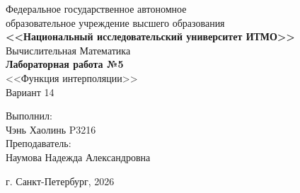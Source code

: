 \begin{titlepage}
    \centering
    Федеральное государственное автономное \\
    образовательное учреждение высшего образования \\
    \textbf{<<Национальный исследовательский университет ИТМО>>} \\

    \vfill
    Вычислительная Математика \\
    \vspace{0.5\baselineskip}
    \textbf{Лабораторная работа №5} \\
    \vspace{0.5\baselineskip}
    <<Функция интерполяции>> \\
    \vspace{0.5\baselineskip}
    Вариант 14 \\

    \vfill

    \flushright
    Выполнил:\\
    Чэнь Хаолинь P3216\\
    Преподаватель:\\
    Наумова Надежда Александровна\\

    \vspace{4\baselineskip}

    \centering
    г. Санкт-Петербург, 2026

\end{titlepage}
